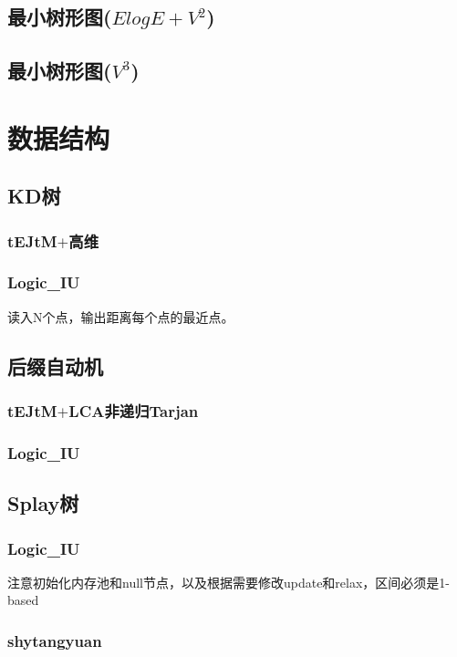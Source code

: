 \documentclass[a4paper,10pt]{book}
\begin{document}
	\section{最小树形图($ElogE+V^2$)}
		
	\section{最小树形图($V^3$)}
		

\chapter{数据结构}
	\section{KD树}
		\subsection{tEJtM$+$高维}
			

	    \subsection{Logic\_IU}
	        读入N个点，输出距离每个点的最近点。
	        

	\section{后缀自动机}
		\subsection{tEJtM$+$LCA非递归Tarjan}
			
		\subsection{Logic\_IU}
			

    \section{Splay树}
		\subsection{Logic\_IU}
			注意初始化内存池和null节点，以及根据需要修改update和relax，区间必须是1-based
			
		\subsection{shytangyuan}
			
\end{document}
